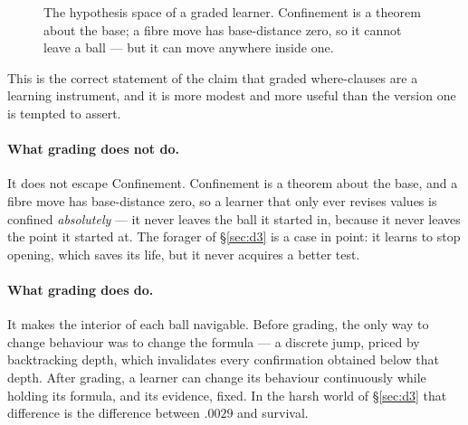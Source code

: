 \begin{figure}[h]
\centering
{}
\caption{The hypothesis space of a graded learner. Confinement is a theorem about
the base; a fibre move has base-distance zero, so it cannot leave a ball --- but it
can move anywhere inside one.}
\label{fig:fibration}
\end{figure}

This is the correct statement of the claim that graded where-clauses are a
learning instrument, and it is more modest and more useful than the version one is
tempted to assert.

\paragraph{What grading does not do.} It does not escape Confinement. Confinement
is a theorem about the base, and a fibre move has base-distance zero, so a learner
that only ever revises values is confined \emph{absolutely} --- it never leaves the
ball it started in, because it never leaves the point it started at. The forager
of \S\ref{sec:d3} is a case in point: it learns to stop opening, which saves its
life, but it never acquires a better test.

\paragraph{What grading does do.} It makes the interior of each ball navigable.
Before grading, the only way to change behaviour was to change the formula --- a
discrete jump, priced by backtracking depth, which invalidates every confirmation
obtained below that depth. After grading, a learner can change its behaviour
continuously while holding its formula, and its evidence, fixed. In the harsh
world of \S\ref{sec:d3} that difference is the difference between $.0029$ and
survival.

